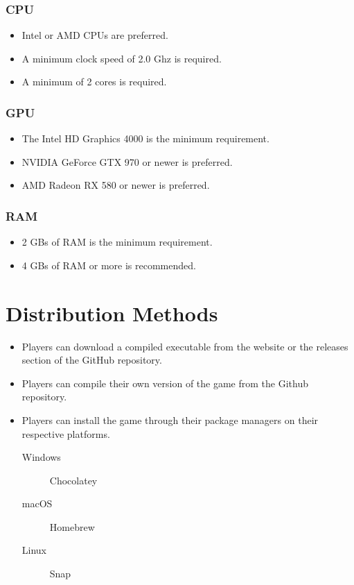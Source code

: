 \subsubsection{CPU}

\begin{itemize}
    \item Intel or AMD CPUs are preferred.
    \item A minimum clock speed of 2.0 Ghz is required.
    \item A minimum of 2 cores is required.
\end{itemize}

\subsubsection{GPU}

\begin{itemize}
    \item The Intel HD Graphics 4000 is the minimum requirement.
    \item NVIDIA GeForce GTX 970 or newer is preferred.
    \item AMD Radeon RX 580 or newer is preferred.
\end{itemize}

\subsubsection{RAM}

\begin{itemize}
    \item 2 GBs of RAM is the minimum requirement.
    \item 4 GBs of RAM or more is recommended.
\end{itemize}

\section{Distribution Methods}

\begin{itemize}
    \item Players can download a compiled executable from the website or the releases section of the GitHub repository.
    \item Players can compile their own version of the game from the Github repository.
    \item Players can install the game through their package managers on their respective platforms.
    \begin{description}
        \item [Windows] Chocolatey
        \item [macOS] Homebrew
        \item [Linux] Snap
    \end{description}
\end{itemize}

